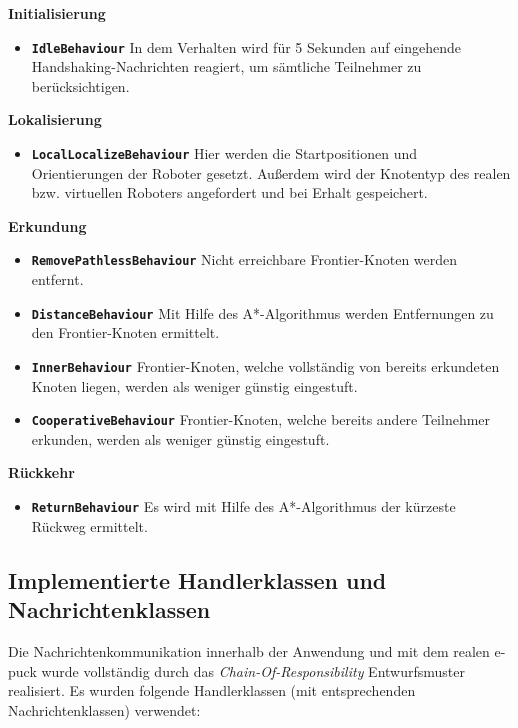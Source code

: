 \documentclass[10pt,a4paper]{article}
\begin{document}
  			\textbf{Initialisierung}
			\begin{itemize}
				\item \textbf{\texttt{IdleBehaviour}} In dem Verhalten wird für 5 Sekunden auf eingehende Handshaking-Nachrichten reagiert, um sämtliche
					Teilnehmer zu berücksichtigen.
			\end{itemize}  
  			\textbf{Lokalisierung}
			\begin{itemize}
				\item \textbf{\texttt{LocalLocalizeBehaviour}} Hier werden die Startpositionen und Orientierungen der Roboter gesetzt. Außerdem wird der Knotentyp
					des realen bzw. virtuellen Roboters angefordert und bei Erhalt gespeichert.
			\end{itemize}
  			\textbf{Erkundung}
			\begin{itemize}
				\item \textbf{\texttt{RemovePathlessBehaviour}} Nicht erreichbare Frontier-Knoten werden entfernt.
				\item \textbf{\texttt{DistanceBehaviour}} Mit Hilfe des A*-Algorithmus werden Entfernungen zu den Frontier-Knoten ermittelt.
				\item \textbf{\texttt{InnerBehaviour}} Frontier-Knoten, welche vollständig von bereits erkundeten Knoten liegen, werden als weniger günstig
					eingestuft.
				\item \textbf{\texttt{CooperativeBehaviour}} Frontier-Knoten, welche bereits andere Teilnehmer erkunden, werden als weniger günstig eingestuft.
			\end{itemize} 							
  			\textbf{Rückkehr}
			\begin{itemize}
				\item \textbf{\texttt{ReturnBehaviour}} Es wird mit Hilfe des A*-Algorithmus der kürzeste Rückweg ermittelt.
			\end{itemize} 			
					
		\subsection{Implementierte Handlerklassen und Nachrichtenklassen}
			Die Nachrichtenkommunikation innerhalb der Anwendung und mit dem realen e-puck wurde vollständig durch das \textit{Chain-Of-Responsibility}
			Entwurfsmuster realisiert. Es wurden folgende Handlerklassen (mit entsprechenden Nachrichtenklassen) verwendet:
			
\end{document}
